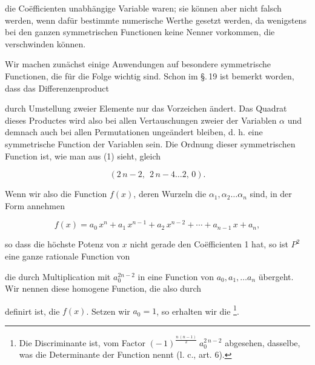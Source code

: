 die Co\"efficienten unabh\"angige Variable waren; sie k\"onnen aber
nicht falsch werden, wenn daf\"ur bestimmte numerische Werthe
gesetzt werden, da wenigstens bei den ganzen symmetrischen
Functionen keine Nenner vorkommen, die verschwinden k\"onnen.

Wir machen zun\"achst einige Anwendungen auf besondere
symmetrische Functionen, die f\"ur die Folge wichtig sind. Schon
im \S.\,19 ist bemerkt worden, dass das Differenzenproduct


durch Umstellung zweier Elemente nur das Vorzeichen \"andert.
Das Quadrat dieses Productes wird also bei allen Vertauschungen
zweier der Variablen $\alpha$ und demnach auch bei allen Permu\-tationen
unge\"andert bleiben, d. h. eine symmetrische Function
der Variablen sein. Die Ordnung dieser symmetrischen Function
ist, wie man aus (1) sieht, gleich

\[
(2\,n - 2,\ \ 2\,n - 4 \ldots 2,\, 0).
\]

Wenn wir also die Function $f(x)$, deren Wurzeln die $\alpha_1, \alpha_2 \ldots \alpha_n$
sind, in der Form annehmen

\[
f(x) = a_0\,x^n + a_1\,x^{n-1} + a_2\,x^{n-2} + \cdots + a_{n-1}\,x + a_n,
\]

so dass die h\"ochste Potenz von $x$ nicht gerade den Co\"efficienten
1 hat, so ist $P^2$ eine ganze rationale Function von


die durch Multiplication mit $a_0^{2n-2}$ in eine  Function
von $a_0, a_1, \ldots a_n$ \"ubergeht. Wir nennen diese homogene Func\-tion,
die also durch


definirt ist, die  $f(x)$. Setzen
wir $a_0 = 1$, so erhalten wir die \footnote{Die Discriminante ist, vom Factor $(-\,1)^{\frac{n\,(n-1)}{2}}\ a_0^{2\,n-2}$ abgesehen,
dasselbe, was  die Determinante der Function nennt (l. c., art. 6).}.
